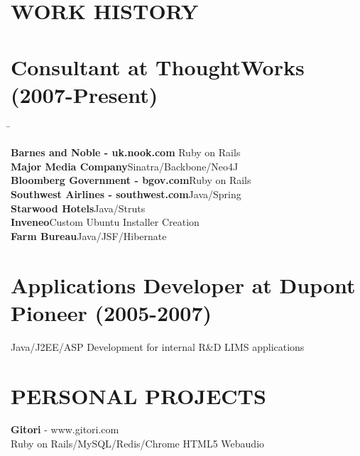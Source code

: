 \documentclass{res}
\begin{document}
 


\address{udit.manektala.com \\  uditmanektala@gmail.com \\  (515) 770-2500}        
                                  
\begin{resume}

\section{WORK HISTORY}          
\section {Consultant at ThoughtWorks (2007-Present)}
   \begin{tabbing}
   \hspace{5.3in}\= \kill %

{\bf Barnes and Noble - uk.nook.com} \>Ruby on Rails \\


{\bf Major Media Company}\>Sinatra/Backbone/Neo4J \\

{\bf Bloomberg Government - bgov.com}\>Ruby on Rails \\

{\bf Southwest Airlines - southwest.com}\>Java/Spring \\

{\bf Starwood Hotels}\>Java/Struts\\

{\bf Inveneo}\>Custom Ubuntu Installer Creation\\

{\bf Farm Bureau}\>Java/JSF/Hibernate \\
 
\section {Applications Developer at Dupont Pioneer (2005-2007)}
Java/J2EE/ASP Development for internal R\&D LIMS applications
\end{tabbing}
\section{PERSONAL PROJECTS}          
    {\bf Gitori}  - www.gitori.com
     \\Ruby on Rails/MySQL/Redis/Chrome HTML5 Webaudio


\end{resume}
\end{document}
